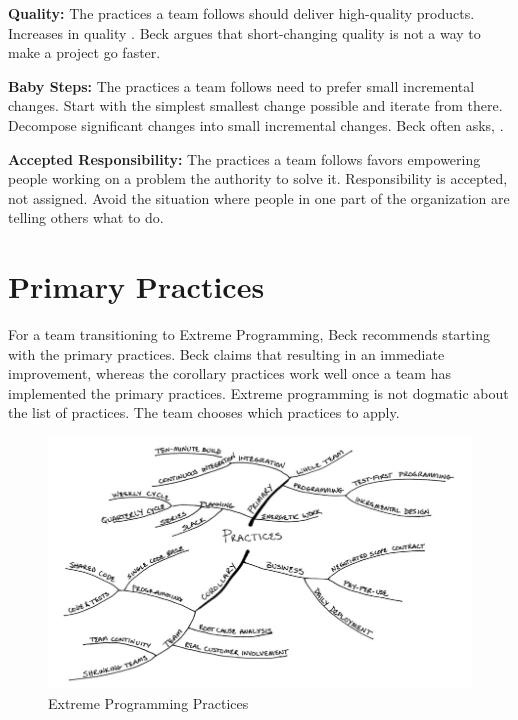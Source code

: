 \textbf{Quality:} The practices a team follows should deliver high-quality products. Increases in quality  \cite{BeckExtremeProgramming2004}. Beck argues that short-changing quality is not a way to make a project go faster. 

\textbf{Baby Steps:} The practices a team follows need to prefer small incremental changes. Start with the simplest smallest change possible and iterate from there. Decompose significant changes into small incremental changes. Beck often asks,  \cite{BeckExtremeProgramming2004}. 

\textbf{Accepted Responsibility:} The practices a team follows favors empowering people working on a problem the authority to solve it. Responsibility is accepted, not assigned. Avoid the situation where people in one part of the organization are telling others what to do. 

\section{Primary Practices}
For a team transitioning to Extreme Programming, Beck recommends starting with the primary practices. Beck claims that  resulting in an immediate improvement, whereas the corollary practices work well once a team has implemented the primary practices. Extreme programming is not dogmatic about the list of practices. The team chooses which practices to apply.

\begin{figure}[t]
\centering
\includegraphics[width=\twoColumnWidth{}]{extreme_programming_images/summary_of_practices.png}
\caption{Extreme Programming Practices \cite{BeckExtremeProgramming2004}}
\label{XPSummaryOfPractices}
\end{figure}


